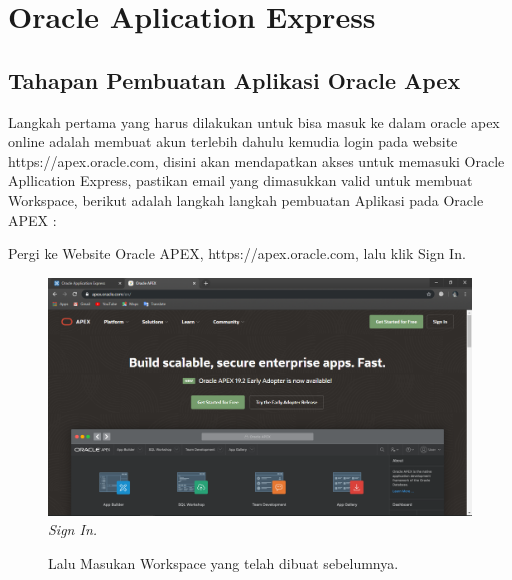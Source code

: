 \chapter{Oracle Aplication Express}

\section{Tahapan Pembuatan Aplikasi Oracle Apex}
Langkah pertama yang harus dilakukan untuk bisa masuk ke dalam oracle apex online adalah membuat akun terlebih dahulu kemudia login pada website https://apex.oracle.com, disini  akan mendapatkan akses untuk memasuki Oracle Apllication Express, pastikan email yang dimasukkan valid untuk membuat Workspace, berikut adalah langkah langkah pembuatan Aplikasi pada Oracle APEX :

\begin{enumerate}
\item[1]Pergi ke Website Oracle APEX, https://apex.oracle.com, lalu klik Sign In.

\begin{figure}[!htbp]
    \begin{center}
    \includegraphics[scale=0.4]{figures/14.png}
    \caption{\textit{Sign In.}}
    \end{center}   
    \end{figure}
    
\begin{figure}[!htbp]
\item[2]Lalu Masukan Workspace yang telah dibuat sebelumnya.


\end{figure}
\end{enumerate}
